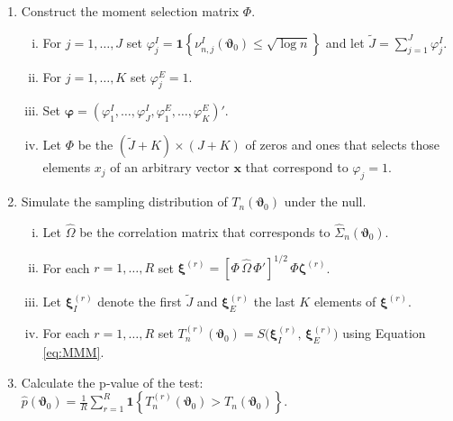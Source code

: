 \begin{alg}
\begin{enumerate}
\begin{enumerate}[(i)]
  \end{enumerate}
\item Construct the moment selection matrix $\Phi$.
      \begin{enumerate}[(i)]
        \item For $j = 1, \hdots, J$ set $\varphi_j^I = \mathbf{1}\left\{\nu_{n,j}^I(\boldsymbol{\vartheta}_0) \leq \sqrt{\log n} \right\}$ and let  $\widetilde{J} = \sum_{j=1}^J \varphi_j^I$.
        \item For $j = 1, \hdots, K$ set $\varphi_j^E = 1$.
        \item Set $\boldsymbol{\varphi} = (\varphi_{1}^I,\hdots, \varphi_{J}^I,\varphi_1^E,\hdots, \varphi_K^E)'$.
        \item Let $\Phi$ be the $(\widetilde{J}+K)\times(J+K)$ of zeros and ones that selects those elements $x_j$ of an arbitrary vector $\mathbf{x}$ that correspond to $\varphi_j = 1$. 
      \end{enumerate}
    \item Simulate the sampling distribution of $T_n(\boldsymbol{\vartheta}_0)$ under the null. 
      \begin{enumerate}[(i)]
        \item Let $\widehat{\Omega}$ be the correlation matrix that corresponds to $\widehat{\Sigma}_n(\boldsymbol{\vartheta}_0)$.
        \item For each $r = 1, \hdots, R$ set $\boldsymbol{\xi}^{(r)} = \left[\Phi\,\widehat{\Omega}\,\Phi'\right]^{1/2}\,\Phi\boldsymbol{\zeta}^{(r)}$.
        \item Let $\boldsymbol{\xi}^{(r)}_I$ denote the first $\widetilde{J}$ and $\boldsymbol{\xi}_E^{(r)}$ the last $K$ elements of $\boldsymbol{\xi}^{(r)}$.  
        \item For each $r = 1, \hdots, R$ set $T^{(r)}_n(\boldsymbol{\vartheta}_0) = S\big( \boldsymbol{\xi}_{I}^{(r)}, \, \boldsymbol{\xi}^{(r)}_E\big)$ using Equation \ref{eq:MMM}.
      \end{enumerate}
    \item Calculate the p-value of the test: $\displaystyle \widehat{p}(\boldsymbol{\vartheta}_0) = \frac{1}{R}\sum_{r=1}^R \mathbf{1}\left\{T_{n}^{(r)}(\boldsymbol{\vartheta}_0) > T_n(\boldsymbol{\vartheta}_0)\right\}$.
  \end{enumerate}
  \label{alg:GMS}
\end{alg}

